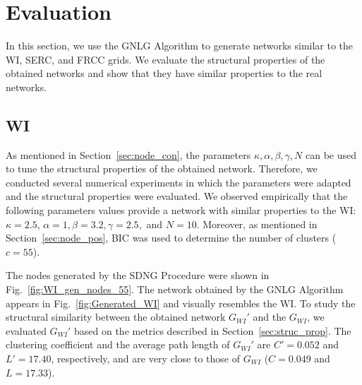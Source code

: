 \documentclass[10pt,journal]{IEEEtran}
\begin{document}
\section{Evaluation}\label{sec:eval}
In this section, we use the GNLG Algorithm to generate networks similar to the WI, SERC, and FRCC grids. We evaluate the structural properties of the obtained networks and show that they have similar properties to the real networks.
\subsection{WI}
As mentioned in Section~\ref{sec:node_con}, the parameters $\kappa,\alpha,\beta,\gamma,N$ can be used to tune the structural properties of the obtained network. Therefore, we conducted several numerical experiments in which the parameters were adapted and the structural properties were evaluated. We observed empirically that the following parameters values provide a network with similar properties to the WI: $\kappa=2.5$, $\alpha = 1, \beta = 3.2, \gamma = 2.5,$ and $N=10$. Moreover, as mentioned in Section~\ref{sec:node_pos}, BIC was used to determine the number of clusters ($c=55$).

The nodes generated by the SDNG Procedure were shown in Fig.~\ref{fig:WI_gen_nodes_55}. The network obtained by the GNLG Algorithm  appears in Fig.~\ref{fig:Generated_WI} and visually resembles the WI. To study the structural similarity between the obtained network $G_{WI}'$ and the $G_{WI}$, we evaluated $G_{WI}'$ based on the metrics described in Section~\ref{sec:struc_prop}. The clustering coefficient and the average path length of $G_{WI}'$ are $C'=0.052$ and $L'=17.40$, respectively, and are very close to those of  $G_{WI}$ ($C=0.049$ and $L=17.33$).
\end{document}
